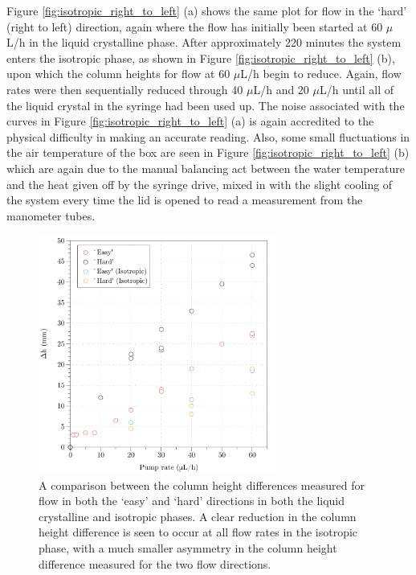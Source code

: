 Figure \ref{fig:isotropic_right_to_left} (a) shows the same plot for flow in the `hard' (right to left) direction, again where the flow has initially been started at 60 $\mu$L/h in the liquid crystalline phase. After approximately 220 minutes the system enters the isotropic phase, as shown in Figure \ref{fig:isotropic_right_to_left} (b), upon which the column heights for flow at 60 $\mu$L/h begin to reduce. Again, flow rates were then sequentially reduced through 40 $\mu$L/h and 20 $\mu$L/h until all of the liquid crystal in the syringe had been used up. The noise associated with the curves in Figure \ref{fig:isotropic_right_to_left} (a) is again accredited to the physical difficulty in making an accurate reading. Also, some small fluctuations in the air temperature of the box are seen in Figure \ref{fig:isotropic_right_to_left} (b) which are again due to the manual balancing act between the water temperature and the heat given off by the syringe drive, mixed in with the slight cooling of the system every time the lid is opened to read a measurement from the manometer tubes.

\begin{figure}
\begin{center}
\includegraphics[width=0.7\textwidth]{Figures/Diode/second_diode/isotropic/iso_diff}
\end{center}
\caption[Summary of column height differences in nematic and isotropic phases]{\label{fig:iso_diode_diff} A comparison between the column height differences measured for flow in both the `easy' and `hard' directions in both the liquid crystalline and isotropic phases. A clear reduction in the column height difference is seen to occur at all flow rates in the isotropic phase, with a much smaller asymmetry in the column height difference measured for the two flow directions.}
\end{figure}

